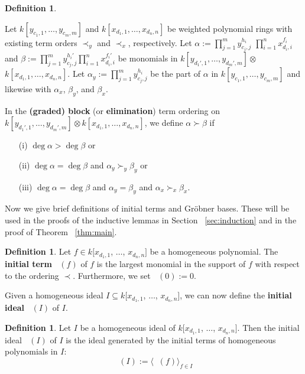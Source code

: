 \documentclass{amsart}
\theoremstyle{plain}
\theoremstyle{definition}
\newtheorem{defn}[thm]{Definition}
\theoremstyle{remark}
\numberwithin{equation}{section}
\DeclareMathOperator{\initial}{in_\prec}
\begin{document}
\begin{defn}
\label{defn:block-order}

Let $k[y_{c_1, 1}, \ldots, y_{c_m, m}]$ and $k[x_{d_1, 1}, \ldots,
x_{d_n, n}]$ be weighted polynomial rings with existing term
orders $\prec_y$ and $\prec_x$, respectively. Let $\alpha :=
\prod_{j = 1}^{m} y_{c_j, j}^{h_i}$ $\prod_{i = 1}^{n} x_{d_i, i}
^{f_i}$ and $\beta := \prod_{j = 1}^{m} y_{c_j, j}^{h_i'}
\prod_{i = 1}^{n} x_{d_i, i}^{f_i'}$ be monomials in $k[y_{d_1', 1},
\ldots, y_{d_m', m}] \otimes$ $k[x_{d_1, 1}, \ldots, x_{d_n, n}]$.
Let $\alpha_y := \prod_{j = 1}^{m} y_{c_j, j}^{h_i}$ be the
part of $\alpha$ in $k[y_{c_1, 1}, \ldots, y_{c_m, m}]$ and
likewise with $\alpha_x$, $\beta_y$, and $\beta_x$.


In the \textbf{(graded) block} (or \textbf{elimination}) term
ordering on $k[y_{d_1', 1}, \ldots, y_{d_m', m}] \otimes k[x_{d_1, 1},
\ldots, x_{d_n, n}]$, we define $\alpha \succ \beta$ if
  \begin{enumerate}
	\item[(i)] $\deg \alpha  > \deg \beta$ or
  \item[(ii)] $\deg \alpha = \deg \beta$ and $\alpha_y \succ_y \beta_y$ or
	\item[(iii)] $\deg \alpha = \deg \beta$ and $\alpha_y = \beta_y$ and $\alpha_x \succ_x \beta_x$.
  \end{enumerate}
\end{defn}

Now we give brief definitions of initial terms and Gr\"{o}bner
bases. These will be used in the proofs of the inductive lemmas
in Section ~\ref{sec:induction} and in the proof of Theorem
~\ref{thm:main}.

\begin{defn}
\label{defn:initial-term}
Let $f \in k[x_{d_1, 1}$, $\ldots$, $x_{d_n, n}]$ be a homogeneous
polynomial. The \textbf{initial term} $\initial(f)$ of $f$
is the largest monomial in the support of $f$ with respect to
the ordering $\prec$. Furthermore, we set $\initial(0) := 0$.
\end{defn}

Given a homogeneous ideal $I \subseteq k[x_{d_1, 1}$, $\ldots$,
$x_{d_n, n}]$, we can now define the \textbf{initial ideal}
$\initial(I)$ of $I$.

\begin{defn}
\label{defn:initial-ideal}
Let $I$ be a homogeneous ideal of $k[x_{d_1, 1}$, $\ldots$,
$x_{d_n, n}]$. Then the initial ideal $\initial(I)$ of $I$ is
the ideal generated by the initial terms of homogeneous polynomials
in $I$:
\[
	\initial(I) := \langle \initial(f) \rangle_{f \in I}
\]
\end{defn}
\end{document}
